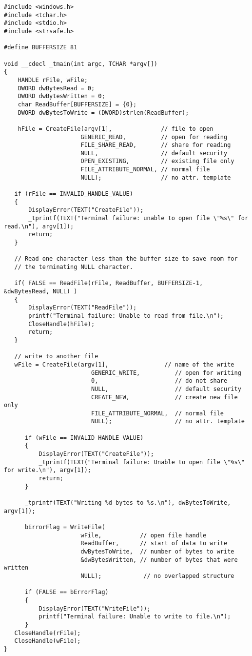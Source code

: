 \documentclass[letterpaper,12pt,titlepage]{article}
\begin{document}
\begin{verbatim}
#include <windows.h>
#include <tchar.h>
#include <stdio.h>
#include <strsafe.h>

#define BUFFERSIZE 81

void __cdecl _tmain(int argc, TCHAR *argv[])
{
    HANDLE rFile, wFile; 
    DWORD dwBytesRead = 0;
	DWORD dwBytesWritten = 0;
    char ReadBuffer[BUFFERSIZE] = {0};
	DWORD dwBytesToWrite = (DWORD)strlen(ReadBuffer);
	
	hFile = CreateFile(argv[1],              // file to open
                      GENERIC_READ,          // open for reading
                      FILE_SHARE_READ,       // share for reading
                      NULL,                  // default security
                      OPEN_EXISTING,         // existing file only
                      FILE_ATTRIBUTE_NORMAL, // normal file
                      NULL);                 // no attr. template

   if (rFile == INVALID_HANDLE_VALUE) 
   { 
       DisplayError(TEXT("CreateFile"));
       _tprintf(TEXT("Terminal failure: unable to open file \"%s\" for read.\n"), argv[1]);
       return; 
   }

   // Read one character less than the buffer size to save room for
   // the terminating NULL character. 

   if( FALSE == ReadFile(rFile, ReadBuffer, BUFFERSIZE-1, &dwBytesRead, NULL) )
   {
       DisplayError(TEXT("ReadFile"));
       printf("Terminal failure: Unable to read from file.\n");
       CloseHandle(hFile);
       return;
   }
   
   // write to another file
   wFile = CreateFile(argv[1],                // name of the write
                         GENERIC_WRITE,          // open for writing
                         0,                      // do not share
                         NULL,                   // default security
                         CREATE_NEW,             // create new file only
                         FILE_ATTRIBUTE_NORMAL,  // normal file
                         NULL);                  // no attr. template

      if (wFile == INVALID_HANDLE_VALUE) 
      { 
          DisplayError(TEXT("CreateFile"));
          _tprintf(TEXT("Terminal failure: Unable to open file \"%s\" for write.\n"), argv[1]);
          return;
      }

      _tprintf(TEXT("Writing %d bytes to %s.\n"), dwBytesToWrite, argv[1]);

      bErrorFlag = WriteFile( 
                      wFile,           // open file handle
                      ReadBuffer,      // start of data to write
                      dwBytesToWrite,  // number of bytes to write
                      &dwBytesWritten, // number of bytes that were written
                      NULL);            // no overlapped structure

      if (FALSE == bErrorFlag)
      {
          DisplayError(TEXT("WriteFile"));
          printf("Terminal failure: Unable to write to file.\n");
      }
   CloseHandle(rFile);
   CloseHandle(wFile);
}
   
\end{verbatim}
\end{document}
